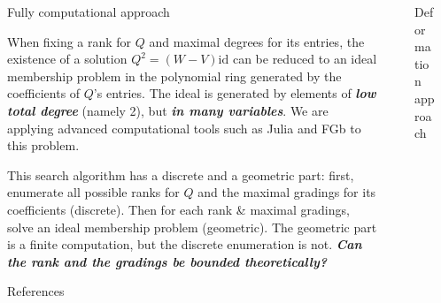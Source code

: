 \documentclass[final]{beamer}
\newlength{\sepwid}
\newlength{\onecolwid}
\begin{document}
\begin{frame}[t]
\begin{columns}[t] %

\begin{column}{\sepwid}\end{column} %

\begin{column}{\onecolwid} %

\begin{block}{Fully computational approach}

When fixing a rank for $Q$ and maximal degrees for its entries, the existence
of a solution $Q^{2}=(W-V)\mathrm{id}$ can be reduced to an ideal membership problem
in the polynomial ring generated by the coefficients of $Q$'s entries.
The ideal is generated by elements of \textbf{\emph{low total degree}}
(namely 2), but \textbf{\emph{in many variables}}. We are applying
advanced computational tools such as Julia and FGb
to this problem.

This search algorithm has a discrete
and a geometric part: first, enumerate all possible ranks for $Q$
and the maximal gradings for its coefficients (discrete). Then for
each rank \& maximal gradings, solve an ideal membership problem (geometric).
The geometric part is a finite computation, but the discrete enumeration
is not. \textbf{\emph{Can the rank and the gradings be bounded theoretically?}}
\end{block}

\vspace{60mm}

\begin{block}{References}

\nocite{*} %
\small{
\vspace{0.75in}}

\end{block}

\end{column} %

\begin{column}{\sepwid}\end{column} %

\begin{column}{\onecolwid} %

\begin{block}{Deformation approach}


\end{block}
\end{column}
\end{columns}
\end{frame}
\end{document}
